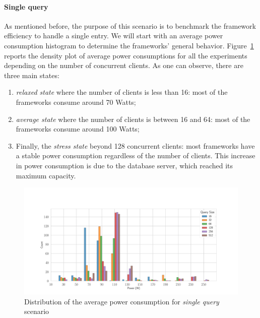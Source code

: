 \paragraph{Single query}
As mentioned before, the purpose of this scenario is to benchmark the framework efficiency to handle a single entry.
We will start with an average power consumption histogram to determine the frameworks' general behavior.
Figure~\ref{fig:av_power_db} reports the density plot of average power consumptions for all the experiments depending on the number of concurrent clients.
As one can observe, there are three main states:
\begin{enumerate}
    \item \emph{relaxed state} where the number of clients is less than 16: most of the frameworks consume around 70 Watts;
    \item \emph{average state} where the number of clients is between 16 and 64: most of the frameworks consume around 100 Watts;
    \item Finally, the \emph{stress state} beyond 128 concurrent clients: most frameworks have a stable power consumption regardless of the number of clients. This increase in power consumption is due to the database server, which reached its maximum capacity.
\end{enumerate}

\begin{figure}[!h]
    \centering
    \includegraphics[width=\textwidth,height=\textheight,keepaspectratio]{imgs/histogram_av_power_cpu_db}
    \caption{Distribution of the average power consumption for \emph{single query} scenario }
    \label{fig:av_power_db}
\end{figure}

